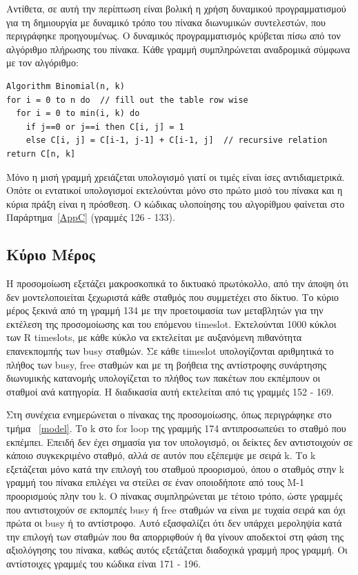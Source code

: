 \documentclass[12pt]{report}
\begin{document}
Αντίθετα, σε αυτή την περίπτωση είναι βολική η χρήση δυναμικού προγραμματισμού για τη δημιουργία με δυναμικό τρόπο του πίνακα διωνυμικών συντελεστών, που περιγράφηκε προηγουμένως. Ο δυναμικός προγραμματισμός κρύβεται πίσω από τον αλγόριθμο πλήρωσης του πίνακα. Κάθε γραμμή συμπληρώνεται αναδρομικά σύμφωνα με τον αλγόριθμο:
\scriptsize
\begin{verbatim}
Algorithm Binomial(n, k)
for i = 0 to n do  // fill out the table row wise
  for i = 0 to min(i, k) do
    if j==0 or j==i then C[i, j] = 1
    else C[i, j] = C[i-1, j-1] + C[i-1, j]  // recursive relation
return C[n, k]
\end{verbatim}
\normalsize
{}
Μόνο η μισή γραμμή χρειάζεται υπολογισμό γιατί οι τιμές είναι ίσες αντιδιαμετρικά. Οπότε οι εντατικοί υπολογισμοί εκτελούνται μόνο στο πρώτο μισό του πίνακα και η κύρια πράξη είναι η πρόσθεση. Ο κώδικας υλοποίησης του αλγορίθμου φαίνεται στο Παράρτημα~\ref{AppC} (γραμμές 126 - 133).

\subsection{Κύριο Μέρος}
Η προσομοίωση εξετάζει μακροσκοπικά το δικτυακό πρωτόκολλο, από την άποψη ότι δεν μοντελοποιείται ξεχωριστά κάθε σταθμός που συμμετέχει στο δίκτυο. Το κύριο μέρος ξεκινά από τη γραμμή 134 με την προετοιμασία των μεταβλητών για την εκτέλεση της προσομοίωσης και του επόμενου \textlatin{timeslot}. Εκτελούνται 1000 κύκλοι των \textlatin{R timeslots}, με κάθε κύκλο να εκτελείται με αυξανόμενη πιθανότητα επανεκπομπής των \textlatin{busy} σταθμών. Σε κάθε \textlatin{timeslot} υπολογίζονται αριθμητικά το πλήθος των \textlatin{busy, free} σταθμών και με τη βοήθεια της αντίστροφης συνάρτησης διωνυμικής κατανομής υπολογίζεται το πλήθος των πακέτων που εκπέμπουν οι σταθμοί ανά κατηγορία. Η διαδικασία αυτή εκτελείται από τις γραμμές 152 - 169.

Στη συνέχεια ενημερώνεται ο πίνακας της προσομοίωσης, όπως περιγράφηκε στο τμήμα ~\ref{model}. Το \textlatin{k} στο \textlatin{for loop} της γραμμής 174 αντιπροσωπεύει το σταθμό που εκπέμπει. Επειδή δεν έχει σημασία για τον υπολογισμό, οι δείκτες δεν αντιστοιχούν σε κάποιο συγκεκριμένο σταθμό, αλλά σε αυτόν που εξέπεμψε με σειρά \textlatin{k}. Το \textlatin{k} εξετάζεται μόνο κατά την επιλογή του σταθμού προορισμού, όπου ο σταθμός στην \textlatin{k} γραμμή του πίνακα επιλέγει να στείλει σε έναν οποιοδήποτε από τους \textlatin{M-1} προορισμούς πλην του \textlatin{k}. Ο πίνακας συμπληρώνεται με τέτοιο τρόπο, ώστε γραμμές που αντιστοιχούν σε εκπομπές \textlatin{busy} ή \textlatin{free} σταθμών να είναι με τυχαία σειρά και όχι πρώτα οι \textlatin{busy} ή το αντίστροφο. Αυτό εξασφαλίζει ότι δεν υπάρχει μεροληψία κατά την επιλογή των σταθμών που θα απορριφθούν ή θα γίνουν αποδεκτοί στη φάση της αξιολόγησης του πίνακα, καθώς αυτός εξετάζεται διαδοχικά γραμμή προς γραμμή. Οι αντίστοιχες γραμμές του κώδικα είναι 171 - 196.
\end{document}

